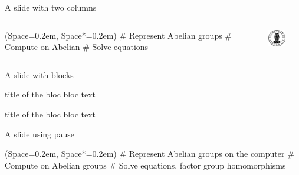 \documentclass[12pt, aspectratio=149]{beamer}
\newcommand{\listSpace}{0.2em}
\theoremstyle{plain}
\begin{document}
\begin{frame}[fragile]{A slide with two columns}
\begin{columns}
\begin{column}{0.5\textwidth}
	\begin{easylist}[itemize]
		\ListProperties(Space=\listSpace, Space*=\listSpace)
		# Represent Abelian groups
		# Compute on Abelian
		# Solve equations
	\end{easylist}
\end{column}
\begin{column}{0.5\textwidth}
    \begin{center}
     \includegraphics[width=0.5\textwidth]{figs/UiB_logo.pdf}
     \end{center}
\end{column}
\end{columns}
\end{frame}


\begin{frame}[fragile]{A slide with blocks}
	\begin{block}{title of the bloc}
	bloc text
	\end{block}
	
	\begin{exampleblock}{title of the bloc}
	bloc text
	\end{exampleblock}
\end{frame}



\begin{frame}[fragile]{A slide using pause}
	\begin{easylist}[itemize]
		\ListProperties(Space=\listSpace, Space*=\listSpace)
		# Represent Abelian groups on the computer \pause
		# Compute on Abelian groups \pause
		# Solve equations, factor group homomorphisms
	\end{easylist}
\end{frame}
\end{document}
